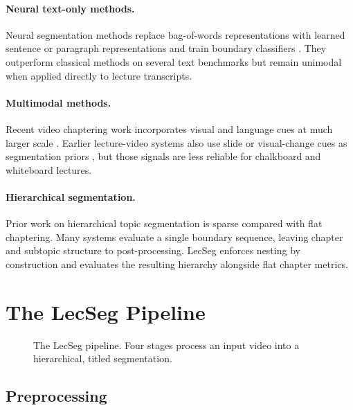 \documentclass[conference]{IEEEtran}
\newcommand{\lecseg}{LecSeg}
\begin{document}
\paragraph{Neural text-only methods.}
Neural segmentation methods replace bag-of-words representations with learned
sentence or paragraph representations and train boundary classifiers
\cite{koshorek2018_neural,li2018_segbot}. They outperform classical methods on
several text benchmarks but remain unimodal when applied directly to lecture
transcripts.

\paragraph{Multimodal methods.}
Recent video chaptering work incorporates visual and language cues at much
larger scale \cite{cao2022_chaptergen,yang2023_vidchapters,yu2024_multimodal}.
Earlier lecture-video systems also use slide or visual-change cues as
segmentation priors \cite{tuna2015_classroom,zhang2016_mooc,chand2021_framework},
but those signals are less reliable for chalkboard and whiteboard lectures.

\paragraph{Hierarchical segmentation.}
Prior work on hierarchical topic segmentation is sparse compared with flat
chaptering. Many systems evaluate a single boundary sequence, leaving chapter
and subtopic structure to post-processing. \lecseg{} enforces nesting by
construction and evaluates the resulting hierarchy alongside flat chapter
metrics.

\section{The \lecseg{} Pipeline}

\begin{figure}[t]
  \centering
  \caption{The \lecseg{} pipeline. Four stages process an input video into a
  hierarchical, titled segmentation.}
  \label{fig:pipeline}
\end{figure}

\subsection{Preprocessing}
\end{document}
